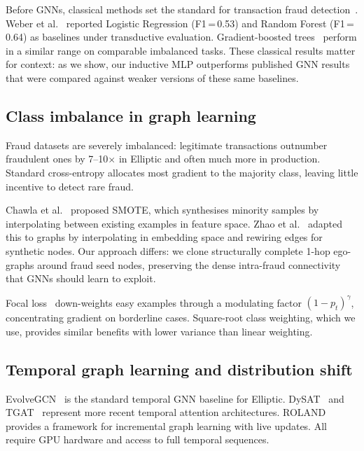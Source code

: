 Before GNNs, classical methods set the standard for transaction fraud
detection~\citep{ngai2011fraudreview,hilal2022fraud}.  Weber et
al.~\citep{weber2019} reported Logistic Regression (F1\,=\,0.53) and
Random Forest (F1\,=\,0.64) as baselines under transductive evaluation.
Gradient-boosted trees~\citep{chen2016xgboost} perform in a similar
range on comparable imbalanced tasks.  These classical results matter
for context: as we show, our inductive MLP outperforms published GNN
results that were compared against weaker versions of these same
baselines.

\subsection{Class imbalance in graph learning}

Fraud datasets are severely imbalanced: legitimate transactions
outnumber fraudulent ones by 7--10$\times$ in Elliptic and often much
more in production.  Standard cross-entropy allocates most gradient to
the majority class, leaving little incentive to detect rare fraud.

Chawla et al.~\citep{chawla2002smote} proposed SMOTE, which
synthesises minority samples by interpolating between existing
examples in feature space.  Zhao et
al.~\citep{zhao2021graphsmote} adapted this to graphs by
interpolating in embedding space and rewiring edges for synthetic
nodes.  Our approach differs: we clone structurally complete 1-hop
ego-graphs around fraud seed nodes, preserving the dense intra-fraud
connectivity that GNNs should learn to exploit.

Focal loss~\citep{lin2017focal} down-weights easy examples through a
modulating factor $(1-p_t)^\gamma$, concentrating gradient on
borderline cases.  Square-root class weighting, which we use, provides
similar benefits with lower variance than linear weighting.

\subsection{Temporal graph learning and distribution shift}

EvolveGCN~\citep{pareja2020evolvegcn} is the standard temporal GNN
baseline for Elliptic.  DySAT~\citep{sankar2020} and
TGAT~\citep{xu2020inductive} represent more recent temporal attention
architectures.  ROLAND~\citep{you2022roland} provides a framework for
incremental graph learning with live updates.  All require GPU
hardware and access to full temporal sequences.


